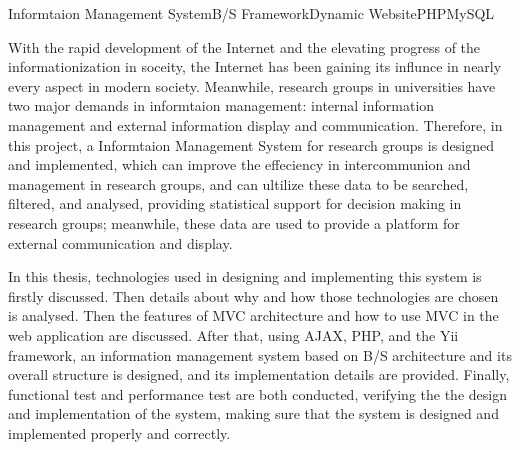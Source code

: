 


\begin{Eabstract}{Informtaion Management System}{B/S Framework}{Dynamic Website}{PHP}{MySQL}

With the rapid development of the Internet and the elevating progress of the informationization in soceity, the Internet has been gaining its influnce in nearly every aspect in modern society. Meanwhile, research groups in universities have two major demands in informtaion management: internal information management and external information display and communication. Therefore, in this project, a Informtaion Management System for research groups is designed and implemented, which can improve the effeciency in intercommunion and management in research groups, and can ultilize these data to be searched, filtered, and analysed, providing statistical support for decision making in research groups; meanwhile, these data are used to provide a platform for external communication and display.

In this thesis, technologies used in designing and implementing this system is firstly discussed. Then details about why and how those technologies are chosen is analysed. Then the features of MVC architecture
and how to use MVC in the web application are discussed. After that, using AJAX, PHP, and the Yii framework, an information management system based on B/S architecture and its overall structure is designed, and its implementation details are provided. Finally,  functional test and performance test are both conducted, verifying the the design and implementation of the system, making sure that the system is designed and implemented properly and correctly.
\end{Eabstract}

